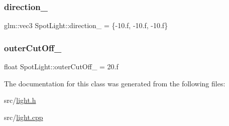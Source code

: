 \mbox{\label{classSpotLight_a55620e0b9baa8ac72dacede2420bf121}} 
\subsubsection{\texorpdfstring{direction\+\_\+}{direction\_}}
{\footnotesize\ttfamily glm\+::vec3 Spot\+Light\+::direction\+\_\+ = \{-\/10.f, -\/10.f, -\/10.f\}}

\mbox{\label{classSpotLight_aea3df0ad93a03e5a477ac431a394178d}} 
\subsubsection{\texorpdfstring{outer\+Cut\+Off\+\_\+}{outerCutOff\_}}
{\footnotesize\ttfamily float Spot\+Light\+::outer\+Cut\+Off\+\_\+ = 20.f}



The documentation for this class was generated from the following files\+:\begin{DoxyCompactItemize}
\item 
src/\hyperlink{light_8h}{light.\+h}\item 
src/\hyperlink{light_8cpp}{light.\+cpp}\end{DoxyCompactItemize}
